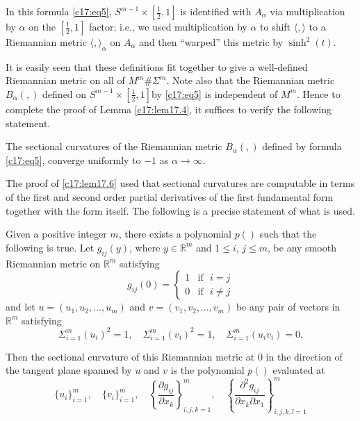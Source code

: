 \begin{remark*}
In this formula \eqref{c17:eq5}, $S^{m-1}\times [\frac{1}{2},1]$ is
identified with $A_{\alpha}$ via multiplication by $\alpha$ on the
$[\frac{1}{2},1]$ factor; i.e., we used multiplication by $\alpha$ to
shift $\langle,\rangle$ to a Riemannian metric
$\langle,\rangle_{\alpha}$ on $A_{\alpha}$ and then ``warped'' this
metric by $\sinh^{2}(t)$.
\end{remark*}

It is easily seen that these definitions fit together to give a
well-defined Riemannian metric on all of $M^{m}\# \Sigma^{m}$. Note
also that the Riemannian metric $B_{\alpha}(,)$ defined on
$S^{m-1}\times [\frac{1}{2},1]$\pageoriginale by \eqref{c17:eq5} is
independent of $M^{m}$. Hence to complete the proof of Lemma
\ref{c17:lem17.4}, it suffices to verify the following statement.

\begin{lemma}\label{c17:lem17.6}
The sectional curvatures of the Riemannian metric $B_{\alpha}(,)$
defined by formula \eqref{c17:eq5}, converge uniformly to $-1$ as
$\alpha\to \infty$.
\end{lemma}

The proof of \ref{c17:lem17.6} used that sectional curvatures are
computable in terms of the first and second order partial derivatives
of the first fundamental form together with the form itself. The
following is a precise statement of what is used.

\begin{thm}\label{c17:thm17.7}
Given a positive integer $m$, there exists a polynomial $p()$ such
that the following is true. Let $g_{ij}(y)$, where $y\in
\mathbb{R}^{m}$ and $1\leq i$, $j\leq m$, be any smooth Riemannian
metric on $\mathbb{R}^{m}$ satisfying
$$
g_{ij}(0) =
\begin{cases}
1 & \text{if~ } i=j\\
0 & \text{if~ } i\neq j
\end{cases}
$$
and let $u=(u_{1},u_{2},\ldots,u_{m})$ and
$v=(v_{1},v_{2},\ldots,v_{m})$ be any pair of vectors in
$\mathbb{R}^{m}$ satisfying
$$
\Sigma^{m}_{i=1}(u_{i})^{2}=1,\quad
\Sigma^{m}_{i=1}(v_{i})^{2}=1,\quad \Sigma^{m}_{i=1}(u_{i}v_{i})=0.
$$

Then the sectional curvature of this Riemannian metric at $0$ in the
direction of the tangent plane spanned by $u$ and $v$ is the
polynomial $p()$ evaluated at
$$
\{u_{i}\}^{m}_{i=1},\quad \{v_{i}\}^{m}_{i=1},\quad
\left\{\frac{\partial g_{ij}}{\partial
  x_{k}}\right\}^{m}_{i,j,k=1},\quad
\left\{\frac{\partial^{2}g_{ij}}{\partial x_{k}\partial
  x_{1}}\right\}^{m}_{i,j,k,l=1} 
$$
\end{thm}

